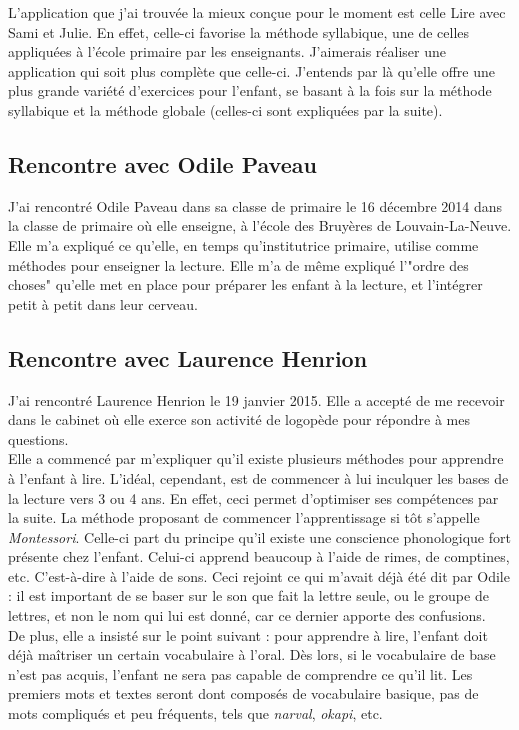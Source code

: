 L'application que j'ai trouvée la mieux conçue pour le moment est celle Lire avec Sami et Julie. En effet, celle-ci favorise la méthode syllabique, une de celles appliquées à l'école primaire par les enseignants. J'aimerais réaliser une application qui soit plus complète que celle-ci. J'entends par là qu'elle offre une plus grande variété d'exercices pour l'enfant, se basant à la fois sur la méthode syllabique et la méthode globale (celles-ci sont expliquées par la suite).

\subsection{Rencontre avec Odile Paveau\label{Freinet}}
J'ai rencontré Odile Paveau dans sa classe de primaire le 16 décembre 2014 dans la classe de primaire où elle enseigne, à l'école des Bruyères de Louvain-La-Neuve. \\

Elle m'a expliqué ce qu'elle, en temps qu'institutrice primaire, utilise comme méthodes pour enseigner la lecture. Elle m'a de même expliqué l'"ordre des choses" qu'elle met en place pour préparer les enfant à la lecture, et l'intégrer petit à petit dans leur cerveau.


\subsection{Rencontre avec Laurence Henrion}
J'ai rencontré Laurence Henrion le 19 janvier 2015. Elle a accepté de me recevoir dans le cabinet où elle exerce son activité de logopède pour répondre à mes questions.\\

Elle a commencé par m'expliquer qu'il existe plusieurs méthodes pour apprendre à l'enfant à lire. L'idéal, cependant, est de commencer à lui inculquer les bases de la lecture vers 3 ou 4 ans. En effet, ceci permet d'optimiser ses compétences par la suite. La méthode proposant de commencer l'apprentissage si tôt s'appelle \textit{Montessori}. Celle-ci part du principe qu'il existe une conscience phonologique fort présente chez l'enfant. Celui-ci apprend beaucoup à l'aide de rimes, de comptines, etc. C'est-à-dire à l'aide de sons. Ceci rejoint ce qui m'avait déjà été dit par Odile : il est important de se baser sur le son que fait la lettre seule, ou le groupe de lettres, et non le nom qui lui est donné, car ce dernier apporte des confusions.\\

De plus, elle a insisté sur le point suivant : pour apprendre à lire, l'enfant doit déjà maîtriser un certain vocabulaire à l'oral. Dès lors, si le vocabulaire de base n'est pas acquis, l'enfant ne sera pas capable de comprendre ce qu'il lit. Les premiers mots et textes seront dont composés de vocabulaire basique, pas de mots compliqués et peu fréquents, tels que \textit{narval}, \textit{okapi}, etc.